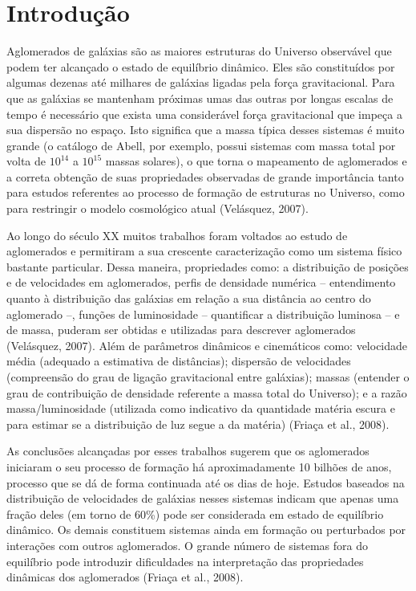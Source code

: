 %
%

\chapter{Introdução}\label{chap:introducao}
Aglomerados de galáxias são as maiores estruturas do Universo observável que podem ter alcançado o estado de equilíbrio dinâmico. Eles são constituídos por algumas dezenas até milhares de galáxias ligadas pela força gravitacional. Para que as galáxias se mantenham próximas umas das outras por longas escalas de tempo é necessário que exista uma considerável força gravitacional que impeça a sua dispersão no espaço. Isto significa que a massa típica desses sistemas é muito grande (o catálogo de Abell, por exemplo, possui sistemas com massa total por volta de $10^{14}$ a $10^{15}$ massas solares), o que torna o mapeamento de aglomerados e a correta obtenção de suas propriedades observadas de grande importância tanto para estudos referentes ao processo de formação de estruturas no Universo, como para restringir o modelo cosmológico atual (Velásquez, 2007).

Ao longo do século XX muitos trabalhos foram voltados ao estudo de aglomerados e permitiram a sua crescente caracterização como um sistema físico bastante particular. Dessa maneira, propriedades como: a distribuição de posições e de velocidades em aglomerados, perfis de densidade numérica – entendimento quanto à distribuição das galáxias em relação a sua distância ao centro do aglomerado –, funções de luminosidade – quantificar a distribuição luminosa – e de massa, puderam ser obtidas e utilizadas para descrever aglomerados (Velásquez, 2007). Além de parâmetros dinâmicos e cinemáticos como: velocidade média (adequado a estimativa de distâncias); dispersão de velocidades (compreensão do grau de ligação gravitacional entre galáxias); massas (entender o grau de contribuição de densidade referente a massa total do Universo); e a razão massa/luminosidade (utilizada como indicativo da quantidade matéria escura e para estimar se a distribuição de luz segue a da matéria) (Friaça et al., 2008).

As conclusões alcançadas por esses trabalhos sugerem que os aglomerados iniciaram o seu processo de formação há aproximadamente 10 bilhões de anos, processo que se dá de forma continuada até os dias de hoje. Estudos baseados na distribuição de velocidades de galáxias nesses sistemas indicam que apenas uma fração deles (em torno de 60\%) pode ser considerada em estado de equilíbrio dinâmico. Os demais constituem sistemas ainda em formação ou perturbados por interações com outros aglomerados. O grande número de sistemas fora do equilíbrio pode introduzir dificuldades na interpretação das propriedades dinâmicas dos aglomerados (Friaça et al., 2008).

